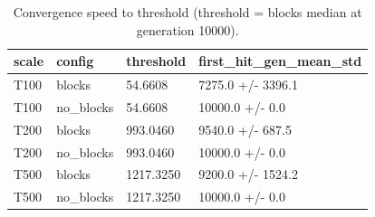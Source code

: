 \begin{table}[htbp]
\centering
\caption{Convergence speed to threshold (threshold = blocks median at generation 10000).}
\label{tab:convergence_speed}
\begin{tabular}{llll}
\toprule
scale & config & threshold & first_hit_gen_mean_std \\
\midrule
T100 & blocks & 54.6608 & 7275.0 +/- 3396.1 \\
T100 & no_blocks & 54.6608 & 10000.0 +/- 0.0 \\
T200 & blocks & 993.0460 & 9540.0 +/- 687.5 \\
T200 & no_blocks & 993.0460 & 10000.0 +/- 0.0 \\
T500 & blocks & 1217.3250 & 9200.0 +/- 1524.2 \\
T500 & no_blocks & 1217.3250 & 10000.0 +/- 0.0 \\
\bottomrule
\end{tabular}
\end{table}
